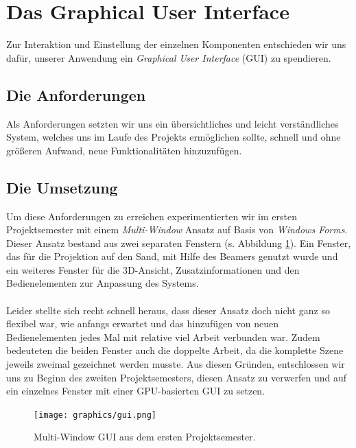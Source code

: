 \section{Das Graphical User Interface}
\begin{Spacing}{\mylinespace}

Zur Interaktion und Einstellung der einzelnen Komponenten entschieden wir uns dafür, unserer Anwendung ein \textit{Graphical User Interface} (GUI) zu spendieren. 

\subsection{Die Anforderungen}

Als Anforderungen setzten wir uns ein übersichtliches und leicht verständliches System, welches uns im Laufe des Projekts ermöglichen sollte, schnell und ohne größeren Aufwand, neue Funktionalitäten hinzuzufügen.  

\subsection{Die Umsetzung}

Um diese Anforderungen zu erreichen experimentierten wir im ersten Projektsemester mit einem \textit{Multi-Window} Ansatz auf Basis von \textit{Windows Forms}. Dieser Ansatz bestand aus zwei separaten Fenstern (s. Abbildung \ref{fig:GUIOld}). Ein Fenster, das für die Projektion auf den Sand, mit Hilfe des Beamers genutzt wurde und ein weiteres Fenster für die 3D-Ansicht, Zusatzinformationen und den Bedienelementen zur Anpassung des Systems.
\\\\
Leider stellte sich recht schnell heraus, dass dieser Ansatz doch nicht ganz so flexibel war, wie anfangs erwartet und das hinzufügen von neuen Bedienelementen jedes Mal mit relative viel Arbeit verbunden war. Zudem bedeuteten die beiden Fenster auch die doppelte Arbeit, da die komplette Szene jeweils zweimal gezeichnet werden musste. Aus diesen Gründen, entschlossen wir uns zu Beginn des zweiten Projektsemesters, diesen Ansatz zu verwerfen und auf ein einzelnes Fenster mit einer GPU-basierten GUI zu setzen.

\begin{figure}[h!]
	\centering
	\vspace*{30px}
	\texttt{[image: graphics/gui.png]}	
	\caption{Multi-Window GUI aus dem ersten Projektsemester.}
	\label{fig:GUIOld}
\end{figure}


\end{Spacing}
